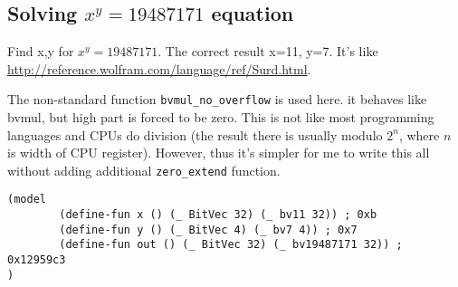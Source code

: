 \subsection{Solving $x^y=19487171$ equation}

Find x,y for $x^y=19487171$.
The correct result x=11, y=7.
It's like \url{http://reference.wolfram.com/language/ref/Surd.html}.

The non-standard function \verb|bvmul_no_overflow| is used here. it behaves like bvmul, but high part is forced to be zero.
This is not like most programming languages and CPUs do division (the result there is usually modulo $2^n$, where $n$ is width of CPU register).
However, thus it's simpler for me to write this all without adding additional \verb|zero_extend| function.



\begin{lstlisting}[caption=The solution]
(model
        (define-fun x () (_ BitVec 32) (_ bv11 32)) ; 0xb
        (define-fun y () (_ BitVec 4) (_ bv7 4)) ; 0x7
        (define-fun out () (_ BitVec 32) (_ bv19487171 32)) ; 0x12959c3
)
\end{lstlisting}

